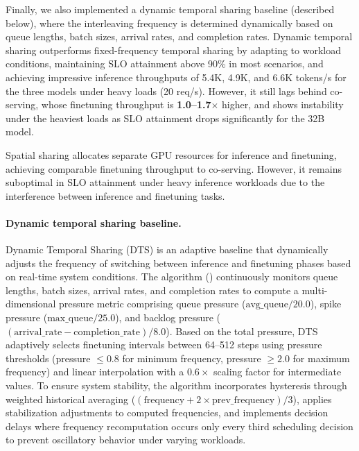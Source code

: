 Finally, we also implemented a dynamic temporal sharing baseline (described below), where the interleaving frequency is determined dynamically based on queue lengths, batch sizes, arrival rates, and completion rates.
Dynamic temporal sharing outperforms fixed-frequency temporal sharing by adapting to workload conditions, maintaining SLO attainment above 90\% in most scenarios, and achieving impressive inference throughputs of 5.4K, 4.9K, and 6.6K tokens/s for the three models under heavy loads (20 req/s). However, it still lags behind co-serving, whose finetuning throughput is \textbf{1.0--1.7$\times$} higher, and shows instability under the heaviest loads as SLO attainment drops significantly for the 32B model.

Spatial sharing allocates separate GPU resources for inference and finetuning, achieving comparable finetuning throughput to co-serving. However, it remains suboptimal in SLO attainment under heavy inference workloads due to the interference between inference and finetuning tasks.

\paragraph{Dynamic temporal sharing baseline.}
\label{flexllm:sec:dts-appendix}
Dynamic Temporal Sharing (DTS) is an adaptive baseline that dynamically adjusts the frequency of switching between inference and finetuning phases based on real-time system conditions. The algorithm () continuously monitors queue lengths, batch sizes, arrival rates, and completion rates to compute a multi-dimensional pressure metric comprising queue pressure ($\text{avg\_queue}/20.0$), spike pressure ($\text{max\_queue}/25.0$), and backlog pressure ($(\text{arrival\_rate} - \text{completion\_rate})/8.0$). Based on the total pressure, DTS adaptively selects finetuning intervals between 64--512 steps using pressure thresholds (pressure $\leq 0.8$ for minimum frequency, pressure $\geq 2.0$ for maximum frequency) and linear interpolation with a $0.6\times$ scaling factor for intermediate values. To ensure system stability, the algorithm incorporates hysteresis through weighted historical averaging ($(\text{frequency} + 2 \times \text{prev\_frequency})/3$), applies stabilization adjustments to computed frequencies, and implements decision delays where frequency recomputation occurs only every third scheduling decision to prevent oscillatory behavior under varying workloads.

